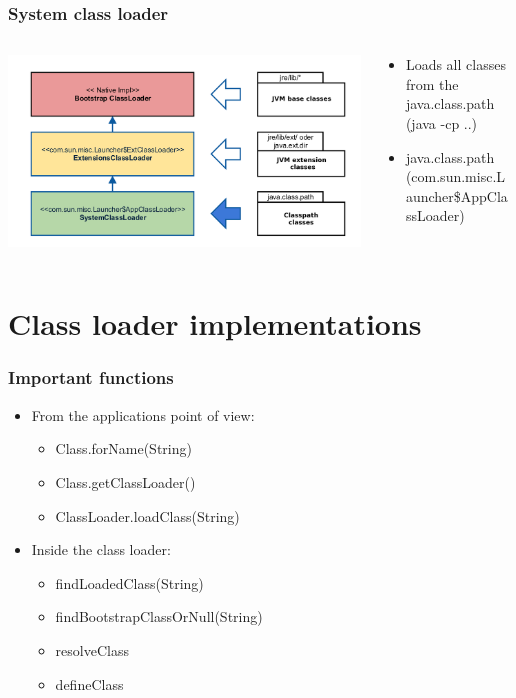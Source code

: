 \documentclass[aspectratio=169]{beamer}
\begin{document}
\begin{frame}
	\frametitle{System class loader}
	\begin{columns}[T] 
	\begin{column}{.46\textwidth}
		\includegraphics[scale=0.06]{assets/classloader-hierachie-system-active.png}
	\end{column}
	\hfill
	\begin{column}{.56\textwidth}

	\begin{itemize}
		\item{Loads all classes from the java.class.path (java -cp ..)}
		\item{java.class.path (com.sun.misc.Launcher\$AppClassLoader)}
	\end{itemize}

	\end{column}
	\end{columns}
\end{frame}

\section{Class loader implementations}

\begin{frame}
	\frametitle{Important functions}
	\begin{itemize}
		\item{From the applications point of view:}
			\begin{itemize}
				\item{Class.forName(String)}
				\item{Class.getClassLoader()}
				\item{ClassLoader.loadClass(String)}
			\end{itemize}
		\item{Inside the class loader:}
			\begin{itemize}
				\item{findLoadedClass(String)}
				\item{findBootstrapClassOrNull(String)}
				\item{resolveClass}
				\item{defineClass}
			\end{itemize}
	\end{itemize}
\end{frame}
\end{document}

